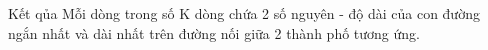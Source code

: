 Kết qủa
Mỗi dòng trong số K dòng chứa 2 số nguyên - độ dài của con đường ngắn nhất và dài nhất trên đường nối giữa 2 thành phố tương ứng.